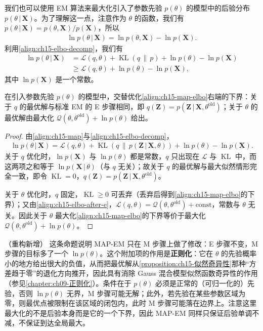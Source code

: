 \documentclass[../../main.tex]{subfiles}
\begin{document}
我们也可以使用 EM 算法来最大化引入了参数先验 $p(\theta)$ 的模型中的后验分布 $p(\theta\,|\,\bm{X})$。为了理解这一点，注意作为 $\theta$ 的函数，我们有 $p(\theta\,|\,\bm{X})=p(\theta,\bm{X})/p(\bm{X})$，所以
\begin{align}
\ln p(\theta\,|\,\bm{X})=\ln p(\theta,\bm{X})-\ln p(\bm{X}).
\label{align:ch15-map}
\end{align}
利用\eqref{align:ch15-elbo-decomp}，我们有
\begin{align}
\ln p(\theta\,|\,\bm{X})
&=\mathcal{L}(q,\theta)+\operatorname{KL}(q\,\|\,p)+\ln p(\theta)-\ln p(\bm{X})\nonumber\\
&\geqslant\mathcal{L}(q,\theta)+\ln p(\theta)-\ln p(\bm{X}),
\label{align:ch15-map-elbo}
\end{align}
其中 $\ln p(\bm{X})$ 是一个常数。

\begin{proposition}\label{proposition:ch15-MAP-EM}
在引入参数先验 $p(\theta)$ 的模型中，交替优化\eqref{align:ch15-map-elbo}右端的下界：关于 $q$ 的最优解与标准 EM 的 E 步骤相同，即 $q(\bm{Z})=p(\bm{Z}\,|\,\bm{X},\theta^{\text{old}})$；关于 $\theta$ 的最优解由最大化 $\mathcal{Q}(\theta,\theta^{\text{old}})+\ln p(\theta)$ 给出。
\end{proposition}
\begin{proof}
由\eqref{align:ch15-map}与\eqref{align:ch15-elbo-decomp}，
\begin{align*}
\ln p(\theta\,|\,\bm{X})=\mathcal{L}(q,\theta)+\operatorname{KL}\!\left(q\,\|\,p(\bm{Z}\,|\,\bm{X},\theta)\right)+\ln p(\theta)-\ln p(\bm{X}).
\end{align*}
关于 $q$ 优化时，$\ln p(\bm{X})$ 与 $\ln p(\theta)$ 都是常数，$q$ 只出现在 $\mathcal{L}$ 与 $\operatorname{KL}$ 中，而这两项之和等于 $\ln p(\bm{X}\,|\,\theta)$（与 $q$ 无关）；故关于 $q$ 的最优解与最大似然情形完全一致，即令 $\operatorname{KL}=0$，$q(\bm{Z})=p(\bm{Z}\,|\,\bm{X},\theta^{\text{old}})$。

关于 $\theta$ 优化时，$q$ 固定，$\operatorname{KL}\geqslant0$ 可丢弃（丢弃后得到\eqref{align:ch15-map-elbo}的下界）；又由\eqref{align:ch15-elbo-after-e}，$\mathcal{L}(q,\theta)=\mathcal{Q}(\theta,\theta^{\text{old}})+\text{const}$，常数与 $\theta$ 无关。因此关于 $\theta$ 最大化\eqref{align:ch15-map-elbo}的下界等价于最大化 $\mathcal{Q}(\theta,\theta^{\text{old}})+\ln p(\theta)$。
\end{proof}

\begin{remark}（重构新增）
这条命题说明 MAP-EM 只在 M 步骤上做了修改：E 步骤不变，M 步骤的目标多了一个 $\ln p(\theta)$。这个附加项的作用是\textbf{正则化}：它在 $\theta$ 的先验概率小的地方给出很大的负值，从而把最优解从\cref{proposition:ch15-似然奇异性}那种“方差趋于零”的退化方向推开，因此具有消除 Gauss 混合模型似然函数奇异性的作用（参见\cref{chapter:ch09-正则化}）。条件在于 $p(\theta)$ 必须是正常的（可归一化的）先验，否则 $\ln p(\theta)$ 无界，M 步骤可能无解；此外，若先验在某些参数区域为零，则最优点被限制在该区域的闭包内，此时 M 步骤可能落在边界上。注意这里最大化的不是后验本身而是它的一个下界，因此 MAP-EM 同样只保证后验单调不减，不保证到达全局最大。
\end{remark}
\end{document}
